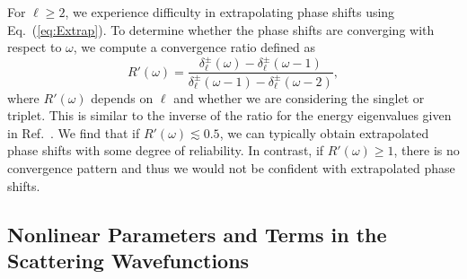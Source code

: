 \documentclass[preprint,showpacs,showkeys,preprintnumbers,amsmath,amssymb,longbibliography,pra,aps]{revtex4-1}
\begin{document}
For $\ell \geq 2$, we experience difficulty in extrapolating phase shifts
using Eq.~(\ref{eq:Extrap}). To determine whether the phase shifts are
converging with respect to $\omega$, we compute a convergence ratio defined as
\begin{equation}
\label{eq:ConvRatio}
R'(\omega) = \frac{\delta_\ell^\pm(\omega)-\delta_\ell^\pm(\omega-1)}
  {\delta_\ell^\pm(\omega-1)-\delta_\ell^\pm(\omega-2)},
\end{equation}
where $R'(\omega)$ depends on $\ell$ and whether we are considering the
singlet or triplet.
This is similar to the inverse of the ratio for the energy eigenvalues given in
Ref.~\cite{Yan1999}. We find that if $R'(\omega) \lesssim 0.5$, we can
typically
obtain extrapolated phase shifts with some degree of reliability. In contrast,
if $R'(\omega) \geq 1$, there is no convergence pattern and thus we would not
be confident with extrapolated phase shifts.


\subsection{Nonlinear Parameters and Terms in the Scattering Wavefunctions}
\label{sec:Parameters}
\end{document}
